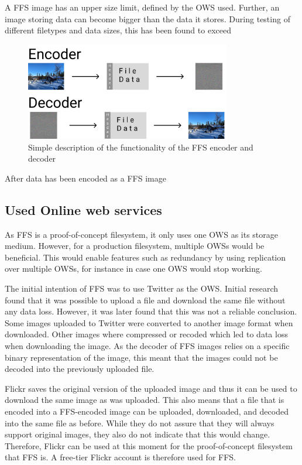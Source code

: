 A FFS image has an upper size limit, defined by the OWS used. Further, an image storing data can become bigger than the data it stores. During testing of different filetypes and data sizes, this has been found to exceed 

\begin{figure}[!ht]
	\begin{center}
	  \includegraphics[width=0.8\textwidth]{figures/encoder_decoder.png}
	\end{center}
	\caption{Simple description of the functionality of the FFS encoder and decoder}
	\label{fig:file_enc_dec}
\end{figure}

After data has been encoded as a FFS image

\subsection{Used Online web services}
As FFS is a proof-of-concept filesystem, it only uses one OWS as its storage medium. However, for a production filesystem, multiple OWSs would be beneficial. This would enable features such as redundancy by using replication over multiple OWSs, for instance in case one OWS would stop working.

The initial intention of FFS was to use Twitter as the OWS. Initial research found that it was possible to upload a file and download the same file without any data loss. However, it was later found that this was not a reliable conclusion. Some images uploaded to Twitter were converted to another image format when downloaded. Other images where compressed or recoded which led to data loss when downloading the image. As the decoder of FFS images relies on a specific binary representation of the image, this meant that the images could not be decoded into the previously uploaded file. 

Flickr saves the original version of the uploaded image and thus it can be used to download the same image as was uploaded. This also means that a file that is encoded into a FFS-encoded image can be uploaded, downloaded, and decoded into the same file as before. While they do not assure that they will always support original images, they also do not indicate that this would change. Therefore, Flickr can be used at this moment for the proof-of-concept filesystem that FFS is. A free-tier Flickr account is therefore used for FFS. 

